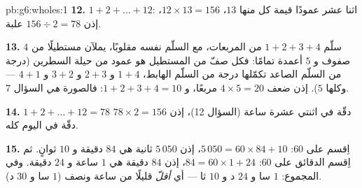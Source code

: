 \begin{solution}{pb:g6:wholes:1}
\textbf{12.} $1 + 2 + \dots + 12$: اثنا عشر عمودًا قيمة كل منها $13$،
  $12 \times 13 = 156$، إذن
$156 \div 2 = 78$ علبة.

\textbf{13.} سلّم  $1 + 2 + 3 + 4$ من المربعات، مع
السلّم نفسه مقلوبًا، يملآن مستطيلًا من $4$ صفوف و $5$
أعمدة تمامًا: فكل صفّ من المستطيل هو عمود من
حيلة السطرين (درجة من السلّم الصاعد تكمّلها
درجة من السلّم الهابط، $1 + 4$ و $2 + 3$ و $3 + 2$ و $4 + 1$ ---
وكلها $5$). إذن ضعف  $4 \times 5 = 20$ مربعًا، و
$1 + 2 + 3 + 4 = 10$: فالصورة \emph{هي} السؤال 7.

\textbf{14.} $1 + 2 + \dots + 12 = 78$ دقّة في اثنتي عشرة ساعة
(السؤال 12)، إذن $78 \times 2 = 156$ دقّة في اليوم كله.

\textbf{15.} اِقسم على $60$: $5\,050 = 60 \times 84 + 10$، إذن
$5\,050$ ثانية هي $84$ دقيقة و $10$ ثوانٍ. ثم اِقسم
الدقائق على $60$: $84 = 60 \times 1 + 24$، إذن $84$ دقيقة هي
$1$ ساعة و $24$ دقيقة. وفي المجموع: $1$ سا و $24$ د و $10$ ثا --- أي
\emph{أقلّ} قليلًا من ساعة ونصف ($1$ سا و $30$ د).
\end{solution}
